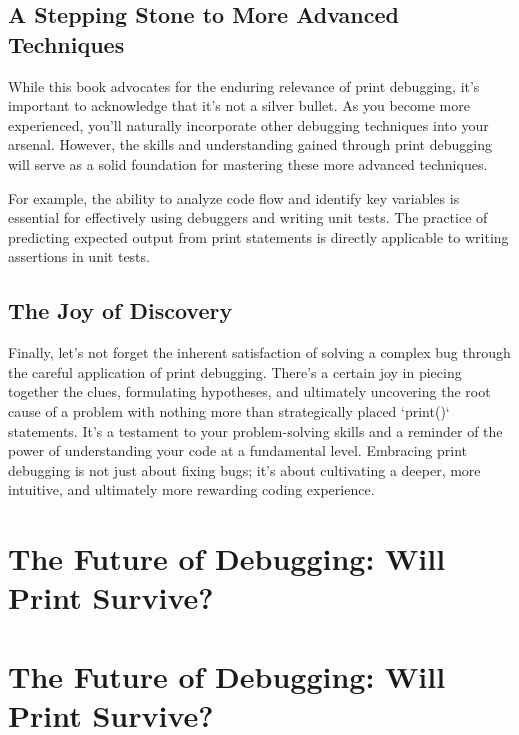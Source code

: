 \documentclass{article}
\begin{document}
{{{{\subsection*{A Stepping Stone to More Advanced Techniques}

While this book advocates for the enduring relevance of print debugging, it's important to acknowledge that it's not a silver bullet. As you become more experienced, you'll naturally incorporate other debugging techniques into your arsenal. However, the skills and understanding gained through print debugging will serve as a solid foundation for mastering these more advanced techniques.

For example, the ability to analyze code flow and identify key variables is essential for effectively using debuggers and writing unit tests. The practice of predicting expected output from print statements is directly applicable to writing assertions in unit tests.

\subsection*{The Joy of Discovery}

Finally, let's not forget the inherent satisfaction of solving a complex bug through the careful application of print debugging. There's a certain joy in piecing together the clues, formulating hypotheses, and ultimately uncovering the root cause of a problem with nothing more than strategically placed `print()` statements. It's a testament to your problem-solving skills and a reminder of the power of understanding your code at a fundamental level. Embracing print debugging is not just about fixing bugs; it's about cultivating a deeper, more intuitive, and ultimately more rewarding coding experience.

\newpage

\section*{The Future of Debugging: Will Print Survive?} %
\label{chapter-10-3-The_Future_of_Debugging__Will_Print_Surv}

\section*{The Future of Debugging: Will Print Survive?}

}}}}
\end{document}

